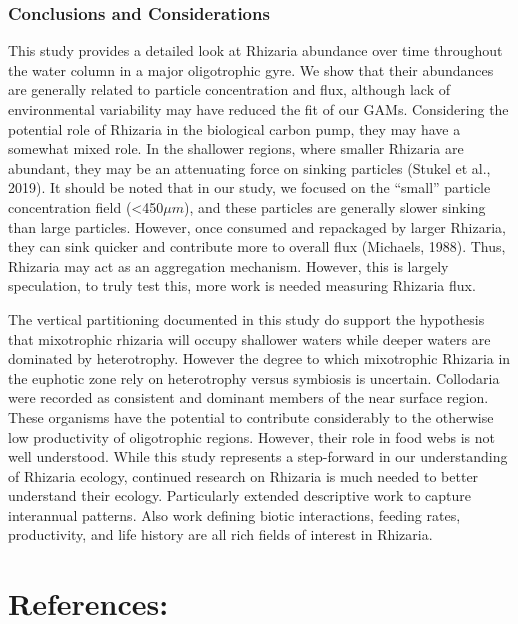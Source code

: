 \documentclass[
]{article}
\begin{document}
\hypertarget{conclusions-and-considerations}{%
\subsubsection{Conclusions and
Considerations}\label{conclusions-and-considerations}}

This study provides a detailed look at Rhizaria abundance over time
throughout the water column in a major oligotrophic gyre. We show that
their abundances are generally related to particle concentration and
flux, although lack of environmental variability may have reduced the
fit of our GAMs. Considering the potential role of Rhizaria in the
biological carbon pump, they may have a somewhat mixed role. In the
shallower regions, where smaller Rhizaria are abundant, they may be an
attenuating force on sinking particles (Stukel et al., 2019). It should
be noted that in our study, we focused on the ``small'' particle
concentration field (\textless450\(\mu m\)), and these particles are
generally slower sinking than large particles. However, once consumed
and repackaged by larger Rhizaria, they can sink quicker and contribute
more to overall flux (Michaels, 1988). Thus, Rhizaria may act as an
aggregation mechanism. However, this is largely speculation, to truly
test this, more work is needed measuring Rhizaria flux.

The vertical partitioning documented in this study do support the
hypothesis that mixotrophic rhizaria will occupy shallower waters while
deeper waters are dominated by heterotrophy. However the degree to which
mixotrophic Rhizaria in the euphotic zone rely on heterotrophy versus
symbiosis is uncertain. Collodaria were recorded as consistent and
dominant members of the near surface region. These organisms have the
potential to contribute considerably to the otherwise low productivity
of oligotrophic regions. However, their role in food webs is not well
understood. While this study represents a step-forward in our
understanding of Rhizaria ecology, continued research on Rhizaria is
much needed to better understand their ecology. Particularly extended
descriptive work to capture interannual patterns. Also work defining
biotic interactions, feeding rates, productivity, and life history are
all rich fields of interest in Rhizaria.

\hypertarget{references}{%
\section{References:}\label{references}}
\end{document}
